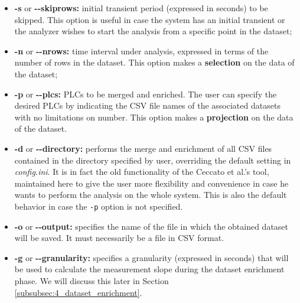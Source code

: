 \begin{itemize}
	\item \textbf{-s} or \textbf{{-}{-}skiprows:} initial transient period (expressed in seconds) to be skipped. This option is useful in case the system has an initial transient or the analyzer wishes to start the analysis from a specific point in the dataset;
	
	\item \textbf{-n} or \textbf{{-}{-}nrows:} time interval under analysis, expressed in terms of the number of rows in the dataset.\newline
	This option makes a \textbf{selection} on the data of the dataset;
	
	\item \textbf{-p} or \textbf{{-}{-}plcs:} PLCs to be merged and enriched. The user can specify the desired PLCs by indicating the CSV file names of the associated datasets with no limitations on number.\newline
	This option makes a \textbf{projection} on the data of the dataset.
	
	\item \textbf{-d} or \textbf{{-}{-}directory:} performs the merge and enrichment of all CSV files contained in the directory specified by user, overriding the default setting in \textit{config.ini}. It is in fact the old functionality of the Ceccato et al.'s tool, maintained here to give the user more flexibility and convenience in case he wants to perform the analysis on the whole system. This is also the default behavior in case the \texttt{-p} option is not specified.
	
	\item \textbf{-o} or \textbf{{-}{-}output:} specifies the name of the file in which the obtained dataset will be saved. It must necessarily be a file in CSV format.
	
	\item \textbf{-g} or \textbf{{-}{-}granularity:} specifies a granularity (expressed in seconds) that will be used to calculate the measurement slope during the dataset enrichment phase. We will discuss this later in Section \ref{subsubsec:4_dataset_enrichment}.
\end{itemize}

